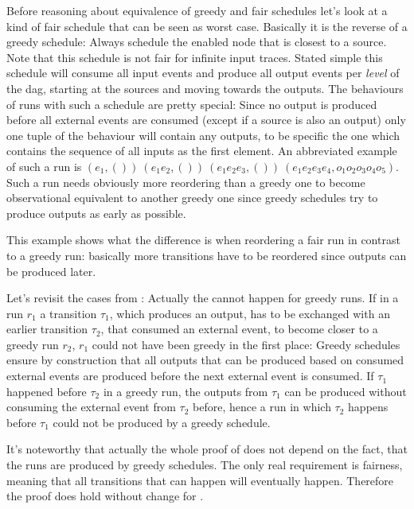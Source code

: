 Before reasoning about equivalence of greedy and fair schedules let's look at a kind of fair schedule that can be seen as worst case.
Basically it is the reverse of a greedy schedule: Always schedule the enabled node that is closest to a source.
Note that this schedule is not fair for infinite input traces.
Stated simple this schedule will consume all input events and produce all output events per \emph{level} of the \gls{dag}, starting at the sources and moving towards the outputs.
The behaviours of runs with such a schedule are pretty special: Since no output is produced before all external events are consumed (except if a source is also an output) only one tuple of the behaviour will contain any outputs, to be specific the one which contains the sequence of all inputs as the first element.
An abbreviated example of such a run is \((e_1,())\ (e_1e_2,())\ (e_1e_2e_3,())\ (e_1e_2e_3e_4,o_1o_2o_3o_4o_5)\).
Such a run needs obviously more reordering than a greedy one to become observational equivalent to another greedy one since greedy schedules try to produce outputs as early as possible.

This example shows what the difference is when reordering a fair run in contrast to a greedy run: basically more transitions have to be reordered since outputs can be produced later.

Let's revisit the cases from :
Actually the  cannot happen for greedy runs.
If in a run \(r_1\) a transition \(\tau_1\), which produces an output, has to be exchanged with an earlier transition \(\tau_2\), that consumed an external event, to become closer to a greedy run \(r_2\), \(r_1\) could not have been greedy in the first place:
Greedy schedules ensure by construction that all outputs that can be produced based on consumed external events are produced before the next external event is consumed.
If \(\tau_1\) happened before \(\tau_2\) in a greedy run, the outputs from \(\tau_1\) can be produced without consuming the external event from \(\tau_2\) before, hence a run in which \(\tau_2\) happens before \(\tau_1\) could not be produced by a greedy schedule.

It's noteworthy that actually the whole proof of  does not depend on the fact, that the runs are produced by greedy schedules.
The only real requirement is fairness, meaning that all transitions that can happen will eventually happen.
Therefore the proof does hold without change for .

